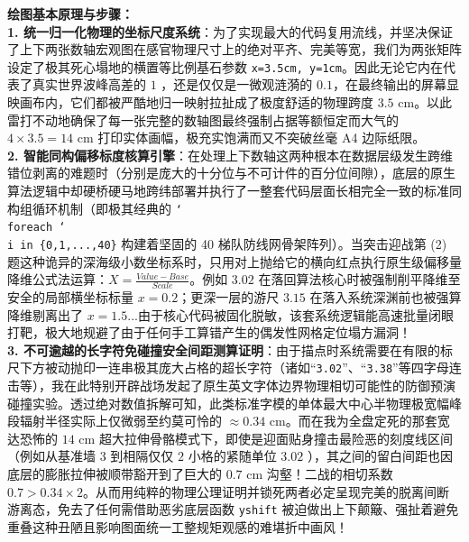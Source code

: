 {\small\color{blue!70!black}
\textbf{绘图基本原理与步骤：}\\
\textbf{1. 统一归一化物理的坐标尺度系统}：为了实现最大的代码复用流线，并坚决保证了上下两张数轴宏观图在感官物理尺寸上的绝对平齐、完美等宽，我们为两张矩阵设定了极其死心塌地的横置等比例基石参数 \texttt{x=3.5cm, y=1cm}。因此无论它内在代表了真实世界波峰高差的 $1$ ，还是仅仅是一微观涟漪的 $0.1$，在最终输出的屏幕显映画布内，它们都被严酷地归一映射拉扯成了极度舒适的物理跨度 $3.5\text{ cm}$。以此雷打不动地确保了每一张完整的数轴图最终强制占据等额恒定而大气的 $4 \times 3.5 = 14\text{ cm}$ 打印实体画幅，极充实饱满而又不突破丝毫 A4 边际纸限。\\
\textbf{2. 智能同构偏移标度核算引擎}：在处理上下数轴这两种根本在数据层级发生跨维错位剥离的难题时（分别是庞大的十分位与不可计件的百分位间隙），底层的原生算法逻辑中却硬桥硬马地跨纬部署并执行了一整套代码层面长相完全一致的标准同构组循环机制（即极其经典的 \texttt{\char`\\foreach \char`\\i in \{0,1,...,40\}} 构建着坚固的 40 梯队防线网骨架阵列）。当突击迎战第 (2) 题这种诡异的深海级小数坐标系时，只用对上抛给它的横向红点执行原生级偏移量降维公式法运算：$X = \frac{Value - Base}{Scale}$。例如 $3.02$ 在落回算法核心时被强制削平降维至安全的局部横坐标标量 $x = 0.2$；更深一层的游尺 $3.15$ 在落入系统深渊前也被强算降维剔离出了 $x = 1.5$...由于核心代码被固化脱敏，该套系统逻辑能高速批量闭眼打靶，极大地规避了由于任何手工算错产生的偶发性网格定位塌方漏洞！\\
\textbf{3. 不可逾越的长字符免碰撞安全间距测算证明}：由于描点时系统需要在有限的标尺下方被动抛印一连串极其庞大占格的超长字符（诸如“\texttt{3.02}”、“\texttt{3.38}”等四字母连击等），我在此特别开辟战场发起了原生英文字体边界物理相切可能性的防御预演碰撞实验。透过绝对数值拆解可知，此类标准字模的单体最大中心半物理极宽幅峰段辐射半径实际上仅微弱至约莫可怜的 $\approx0.34\text{ cm}$。而在我为全盘定死的那套宽达恐怖的 $14\text{ cm}$ 超大拉伸骨骼模式下，即使是迎面贴身撞击最险恶的刻度线区间（例如从基准墙 $3$ 到相隔仅仅 $2$ 小格的紧随单位 $3.02$ ），其之间的留白间距也因底层的膨胀拉伸被顺带豁开到了巨大的 $0.7\text{ cm}$ 沟壑！二战的相切系数 $0.7 > 0.34\times2$。从而用纯粹的物理公理证明并锁死两者必定呈现完美的脱离间断游离态，免去了任何需借助恶劣底层函数 \texttt{yshift} 被迫做出上下颠簸、强扯着避免重叠这种丑陋且影响图面统一工整规矩观感的难堪折中画风！
}


\newpage



\newpage

